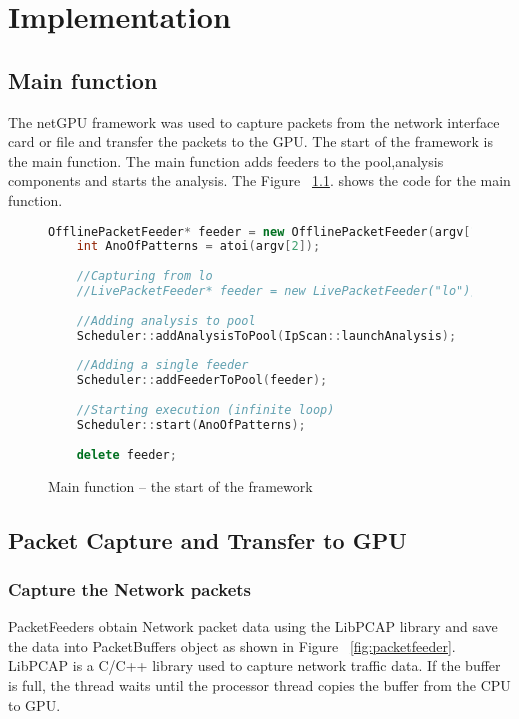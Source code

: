 \chapter{Implementation}

\section{Main function}
The netGPU \cite{bib3} framework was used to capture packets from the network interface card or file and transfer the packets to the GPU. The start of the framework is the main function. The main function adds feeders to the pool,analysis components and starts the analysis. The Figure ~\ref{fig:main}. shows the code for the main function.

\begin{figure}
	\centering
	\begin{lstlisting}[frame=none,language=C++] 
	OfflinePacketFeeder* feeder = new OfflinePacketFeeder(argv[1]);
	int AnoOfPatterns = atoi(argv[2]);
	
	//Capturing from lo
	//LivePacketFeeder* feeder = new LivePacketFeeder("lo");
	
	//Adding analysis to pool
	Scheduler::addAnalysisToPool(IpScan::launchAnalysis);
	
	//Adding a single feeder
	Scheduler::addFeederToPool(feeder);
	
	//Starting execution (infinite loop)
	Scheduler::start(AnoOfPatterns);
		
	delete feeder;
	\end{lstlisting}
	\caption{Main function – the start of the framework \cite{bib3}}
	\label{fig:main}
\end{figure}

\section{Packet Capture and Transfer to GPU}

\subsection{Capture the Network packets}
PacketFeeders obtain Network packet data using the LibPCAP library and save the data into PacketBuffers object as shown in Figure ~\ref{fig:packetfeeder}. LibPCAP \cite{bib4} is a C/C++ library used to capture network traffic data. If the buffer is full, the thread waits until the processor thread copies the buffer from the CPU to GPU. 

